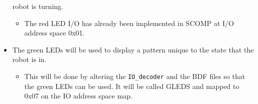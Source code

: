 \begin{itemize}
  robot is turning.
  \begin{itemize}
  \item The red LED I/O has already been implemented in
    SCOMP at I/O address space 0x01.
  \end{itemize}
\item The green LEDs will be used to display a pattern unique to the state that the robot is in.
  \begin{itemize}
  \item This will be done by altering the \verb+IO_decoder+ and the BDF
    files so that the green LEDs can be used. It will be called GLEDS
    and mapped to 0x07 on the IO address space map.
  \end{itemize}
\end{itemize}









